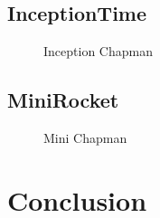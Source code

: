 \documentclass{article}
\begin{document}
\subsection{InceptionTime}
\begin{figure}[htbp]
  \caption{Inception Chapman}\label{fig:inception_chapman}
\end{figure}
\subsection{MiniRocket}
\begin{figure}[htbp]
  \caption{Mini Chapman}\label{fig:mini_chapman}
\end{figure}
\section{Conclusion}
\printbibliography
\end{document}
